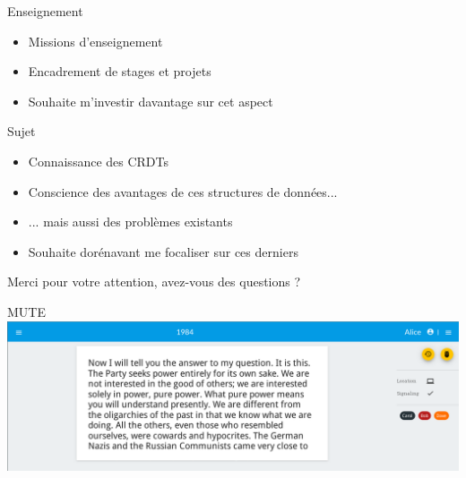 \documentclass[xcolor=table]{beamer}
\begin{document}
\begin{frame}{Enseignement}
  \begin{itemize}
  \item Missions d'enseignement
  \item Encadrement de stages et projets
  \item Souhaite m'investir davantage sur cet aspect
  \end{itemize}
\end{frame}

\begin{frame}{Sujet}
  \begin{itemize}
  \item Connaissance des CRDTs
  \item Conscience des avantages de ces structures de données...
  \item ... mais aussi des problèmes existants
  \item Souhaite dorénavant me focaliser sur ces derniers
  \end{itemize}
\end{frame}

\begin{frame}[standout]
  Merci pour votre attention, avez-vous des questions ?
\end{frame}

\appendix

\begin{frame}{MUTE}
  \includegraphics[scale=0.28]{fig/MUTE.png}
\end{frame}
\end{document}

